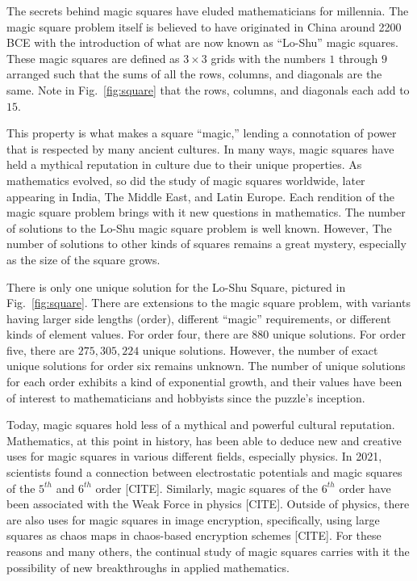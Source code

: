 \documentclass[12pt]{report}
\begin{document}
\par The secrets behind magic squares have eluded mathematicians for millennia. The magic square
problem itself is believed to have originated in China around 2200 BCE with the introduction of
what are now known as “Lo-Shu” magic squares. These magic squares are defined as $3\times3$ grids
with the numbers $1$ through $9$ arranged such that the sums of all the rows, columns, and
diagonals are the same. Note in Fig.~\ref{fig:square} that the rows, columns, and diagonals each
add to $15$.

\par This property is what makes a square ``magic,'' lending a connotation of power that is
respected by many ancient cultures. In many ways, magic squares have held a mythical reputation in
culture due to their unique properties. As mathematics evolved, so did the study of magic squares
worldwide, later appearing in India, The Middle East, and Latin Europe. Each rendition of the magic
square problem brings with it new questions in mathematics. The number of solutions to the Lo-Shu
magic square problem is well known. However, The number of solutions to other kinds of squares
remains a great mystery, especially as the size of the square grows.

\par There is only one unique solution for the Lo-Shu Square, pictured in Fig.~\ref{fig:square}.
There are extensions to the magic square problem, with variants having larger side lengths (order),
different ``magic'' requirements, or different kinds of element values. For order four, there are
$880$ unique solutions. For order five, there are $275,305,224$ unique solutions. However, the
number of exact unique solutions for order six remains unknown. The number of unique solutions for
each order exhibits a kind of exponential growth, and their values have been of interest to
mathematicians and hobbyists since the puzzle's inception.

\par Today, magic squares hold less of a mythical and powerful cultural reputation. Mathematics, at
this point in history, has been able to deduce new and creative uses for magic squares in various
different fields, especially physics. In 2021, scientists found a connection between electrostatic
potentials and magic squares of the $5^{th}$ and $6^{th}$ order [CITE]. Similarly, magic squares of
the $6^{th}$ order have been associated with the Weak Force in physics [CITE]. Outside of physics,
there are also uses for magic squares in image encryption, specifically, using large squares as
chaos maps in chaos-based encryption schemes [CITE]. For these reasons and many others, the
continual study of magic squares carries with it the possibility of new breakthroughs in applied
mathematics.
\end{document}
